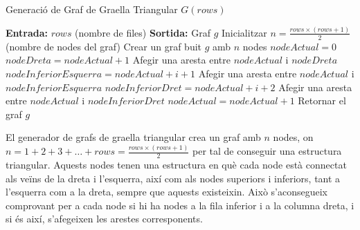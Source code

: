 \documentclass[a4paper]{article}
\begin{document}
	\begin{algorithm} [H]
		\caption{Generació de Graf de Graella Triangular $G(rows)$}
		\begin{algorithmic} [1]
			\Statex \textbf{Entrada:} $rows$ (nombre de files)
			\Statex \textbf{Sortida:} Graf $g$
			\Statex \vspace{-0.25em}
			\State Inicialitzar $n = \frac{rows \times (rows + 1)}{2}$ (nombre de nodes del graf)
			\State Crear un graf buit $g$ amb $n$ nodes
			\State $nodeActual = 0$
						\State $nodeDreta = nodeActual + 1$
						\State Afegir una aresta entre $nodeActual$ i $nodeDreta$
					\EndIf
						\State $nodeInferiorEsquerra = nodeActual + i + 1$
						\State Afegir una aresta entre $nodeActual$ i $nodeInferiorEsquerra$
						\State $nodeInferiorDret = nodeActual + i + 2$
						\State Afegir una aresta entre $nodeActual$ i $nodeInferiorDret$
					\EndIf
					\State $nodeActual = nodeActual + 1$
				\EndFor
			\EndFor
			\State Retornar el graf $g$
		\end{algorithmic}
	\end{algorithm}
	
	El generador de grafs de graella triangular crea un graf amb \( n \) nodes, on \( n = 1 + 2 + 3 + \ldots + rows = \frac{rows \times (rows + 1)}{2} \) per tal de conseguir una estructura triangular. Aquests nodes tenen una estructura en què cada node està connectat als veïns de la dreta i l'esquerra, així com als nodes superiors i inferiors, tant a l'esquerra com a la dreta, sempre que aquests existeixin. Això s'aconsegueix comprovant per a cada node si hi ha nodes a la fila inferior i a la columna dreta, i si és així, s'afegeixen les arestes corresponents. \\
\end{document}

